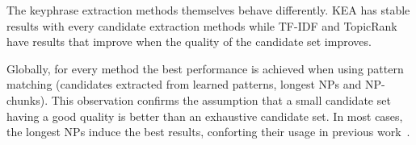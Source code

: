       
      The keyphrase extraction methods themselves behave differently. KEA has
      stable results with every candidate extraction methods while TF-IDF and
      TopicRank have results that improve when the quality of the candidate set
      improves.

      Globally, for every method the best performance is achieved when using
      pattern matching (candidates extracted from learned patterns, longest NPs
      and NP-chunks). This observation confirms the assumption that a small
      candidate set having a good quality is better than an exhaustive
      candidate set. In most cases, the longest NPs induce the best results,
      conforting their usage in previous
      work~\cite{wan2008expandrank,hassan2010conundrums,bougouin2013topicrank}.

